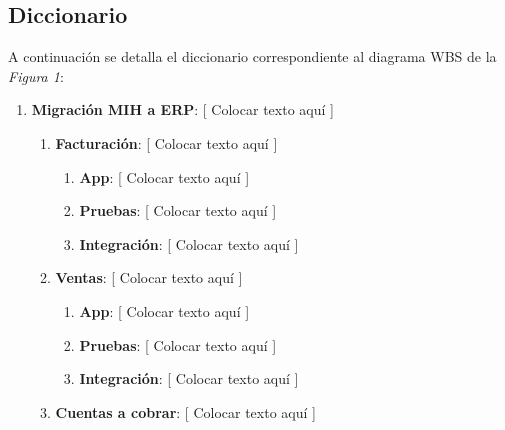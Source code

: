 \documentclass{article}
\begin{document}
\subsection{Diccionario}

	A continuación se detalla el diccionario correspondiente al diagrama WBS de la \textit{Figura 1}:
	\bigskip

	\begin{enumerate}
		\itemsep=3pt \topsep=0pt \partopsep=0pt \parskip=0pt \parsep=0pt
		
		\item \textbf{Migración MIH a ERP}: [ Colocar texto aquí ]

			\begin{enumerate}[label*=\arabic*.]

				\item \textbf{Facturación}: [ Colocar texto aquí ]

					\begin{enumerate}[label*=\arabic*.]
						\itemsep=3pt \topsep=0pt \partopsep=0pt \parskip=0pt \parsep=0pt

						\item \textbf{App}: [ Colocar texto aquí ]

						\item \textbf{Pruebas}: [ Colocar texto aquí ]

						\item \textbf{Integración}: [ Colocar texto aquí ]

					\end{enumerate}
			
				\item \textbf{Ventas}: [ Colocar texto aquí ]

					\begin{enumerate}[label*=\arabic*.]
						\itemsep=3pt \topsep=0pt \partopsep=0pt \parskip=0pt \parsep=0pt

						\item \textbf{App}: [ Colocar texto aquí ]

						\item \textbf{Pruebas}: [ Colocar texto aquí ]

						\item \textbf{Integración}: [ Colocar texto aquí ]

					\end{enumerate}

				\item \textbf{Cuentas a cobrar}: [ Colocar texto aquí ]


\end{enumerate}
\end{enumerate}
\end{document}
